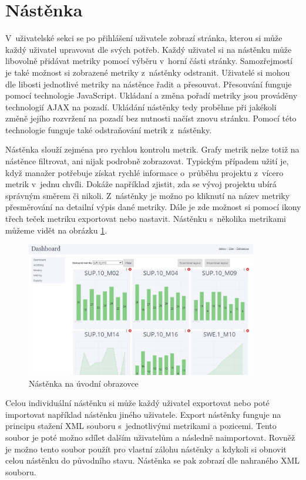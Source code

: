\documentclass[czech,master]{diploma}
\begin{document}
\section{Nástěnka}
V~uživatelské sekci se po přihlášení uživatele zobrazí stránka, kterou si může každý uživatel upravovat dle svých potřeb. Každý uživatel si na nástěnku může libovolně přidávat metriky pomocí výběru v~horní části stránky. Samozřejmostí je také možnost si zobrazené metriky z~nástěnky odstranit. Uživatelé si mohou dle libosti jednotlivé metriky na nástěnce řadit a přesouvat. Přesouvání funguje pomocí technologie JavaScript. Ukládaní a změna pořadí metriky jsou prováděny technologií AJAX na pozadí. Ukládání nástěnky tedy proběhne při jakékoli změně jejího rozvržení na pozadí bez nutnosti načíst znovu stránku. Pomocí této technologie funguje také odstraňování metrik z~nástěnky.

Nástěnka slouží zejména pro rychlou kontrolu metrik. Grafy metrik nelze totiž na nástěnce filtrovat, ani nijak podrobně zobrazovat. Typickým případem užití je, když manažer potřebuje získat rychlé informace o~průběhu projektu z~vícero metrik v~jednu chvíli. Dokáže například zjistit, zda se vývoj projektu ubírá správným směrem či nikoli. Z~nástěnky je možno po kliknutí na název metriky přesměrování na detailní výpis dané metriky. Dále je zde možnost si pomocí ikony třech teček metriku exportovat nebo nastavit. Nástěnku s~několika metrikami můžeme vidět na obrázku \ref{fig:dashboard_metrics}.

\begin{figure}[!ht]
    \centering
    \includegraphics[width=0.9\textwidth]{Diplomka/Figures/dashboard_metrics.jpg}
    \caption{Nástěnka na úvodní obrazovce}
    \label{fig:dashboard_metrics}
\end{figure}

Celou individuální nástěnku si může každý uživatel exportovat nebo poté importovat například nástěnku jiného uživatele. Export nástěnky funguje na principu stažení XML souboru s~jednotlivými metrikami a pozicemi. Tento soubor je poté možno sdílet dalším uživatelům a následně naimportovat. Rovněž je možno tento soubor použít pro vlastní zálohu nástěnky a kdykoli si obnovit celou nástěnku do původního stavu. Nástěnka se pak zobrazí dle nahraného XML souboru.
\end{document}
